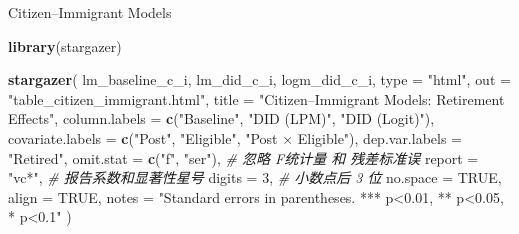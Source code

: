 \documentclass[
]{article}
\newenvironment{Shaded}{\begin{snugshade}}{\end{snugshade}}
\newcommand{\AttributeTok}[1]{\textcolor[rgb]{0.13,0.29,0.53}{#1}}
\newcommand{\CommentTok}[1]{\textcolor[rgb]{0.56,0.35,0.01}{\textit{#1}}}
\newcommand{\ConstantTok}[1]{\textcolor[rgb]{0.56,0.35,0.01}{#1}}
\newcommand{\DecValTok}[1]{\textcolor[rgb]{0.00,0.00,0.81}{#1}}
\newcommand{\FunctionTok}[1]{\textcolor[rgb]{0.13,0.29,0.53}{\textbf{#1}}}
\newcommand{\NormalTok}[1]{#1}
\newcommand{\StringTok}[1]{\textcolor[rgb]{0.31,0.60,0.02}{#1}}
\begin{document}
Citizen--Immigrant Models

\begin{Shaded}
\begin{Highlighting}[]
\FunctionTok{library}\NormalTok{(stargazer)}

\FunctionTok{stargazer}\NormalTok{(}
\NormalTok{  lm\_baseline\_c\_i, lm\_did\_c\_i, logm\_did\_c\_i,}
  \AttributeTok{type =} \StringTok{"html"}\NormalTok{,}
  \AttributeTok{out =} \StringTok{"table\_citizen\_immigrant.html"}\NormalTok{,}
  \AttributeTok{title =} \StringTok{"Citizen–Immigrant Models: Retirement Effects"}\NormalTok{,}
  \AttributeTok{column.labels =} \FunctionTok{c}\NormalTok{(}\StringTok{"Baseline"}\NormalTok{, }\StringTok{"DID (LPM)"}\NormalTok{, }\StringTok{"DID (Logit)"}\NormalTok{),}
  \AttributeTok{covariate.labels =} \FunctionTok{c}\NormalTok{(}\StringTok{"Post"}\NormalTok{, }\StringTok{"Eligible"}\NormalTok{, }\StringTok{"Post × Eligible"}\NormalTok{),}
  \AttributeTok{dep.var.labels =} \StringTok{"Retired"}\NormalTok{,}
  \AttributeTok{omit.stat =} \FunctionTok{c}\NormalTok{(}\StringTok{"f"}\NormalTok{, }\StringTok{"ser"}\NormalTok{),   }\CommentTok{\# 忽略 F统计量 和 残差标准误}
  \AttributeTok{report =} \StringTok{"vc*"}\NormalTok{,              }\CommentTok{\# 报告系数和显著性星号}
  \AttributeTok{digits =} \DecValTok{3}\NormalTok{,                  }\CommentTok{\# 小数点后 3 位}
  \AttributeTok{no.space =} \ConstantTok{TRUE}\NormalTok{,}
  \AttributeTok{align =} \ConstantTok{TRUE}\NormalTok{,}
  \AttributeTok{notes =} \StringTok{"Standard errors in parentheses. *** p\textless{}0.01, ** p\textless{}0.05, * p\textless{}0.1"}
\NormalTok{)}
\end{Highlighting}
\end{Shaded}
\end{document}

